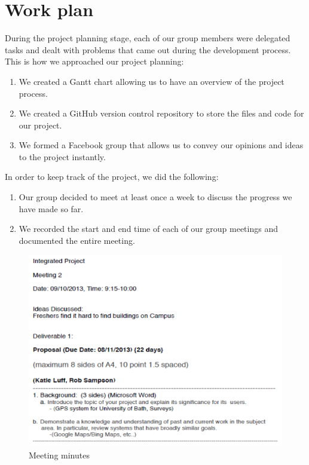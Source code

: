 \documentclass[10pt,a4paper,oneside]{report}
\begin{document}
\section*{Work plan}
During the project planning stage, each of our group members were delegated tasks and dealt with problems that came out during the development process.
This is how we approached our project planning:
\begin{enumerate}
\item{We created a Gantt chart allowing us to have an overview of the project process.}
\item{We created a GitHub version control repository to store the files and code for our project.}
\item{We formed a Facebook group that allows us to convey our opinions and ideas to the project instantly.}
\end{enumerate}
In order to keep track of the project, we did the following:
\begin{enumerate}
\item{Our group decided to meet at least once a week to discuss the progress we have made so far.}
\item{We recorded the start and end time of each of our group meetings and documented the entire meeting.}
\end{enumerate}

\begin{figure}[H]
 \centering
 \includegraphics[keepaspectratio, scale=0.5]{meeting.png}
 \caption{Meeting minutes}
\end{figure}


\end{document}
